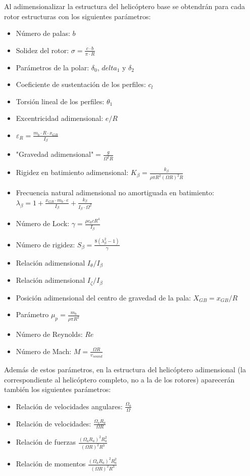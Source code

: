 Al adimensionalizar la estructura del helicóptero base se obtendrán para cada rotor estructuras con los siguientes parámetros:
\singlespacing
\begin{multicols}{2}
	\begin{itemize}
		\item Número de palas: $b$
		\item Solidez del rotor: $\sigma=\frac{c\cdot b}{\pi\cdot R}$
		\item Parámetros de la polar: $\delta_0$, $delta_1$ y $\delta_2$
		\item Coeficiente de sustentación de los perfiles: $c_l$
		\item Torsión lineal de los perfiles: $\theta_1$
		\item Excentricidad adimensional: $e/R$
		\item $\varepsilon_R=\frac{m_b\cdot R\cdot x_{GB}}{I_\beta}$
		\item "Gravedad adimensional"$=\frac{g}{\Omega^2R}$
		\item Rigidez en batimiento adimensional: $K_\beta=\frac{k_\beta}{\rho \pi R^2(\Omega R)^2R}$
		\item Frecuencia natural adimensional no amortiguada en batimiento: $\lambda_\beta=1+\frac{x_{GB}\cdot m_b\cdot e}{I_\beta}+\frac{k_\beta}{I_\beta\cdot\Omega^2}$
		\item Número de Lock: $\gamma=\frac{\rho c_0cR^4}{I_\beta}$
		\item Número de rigidez: $S_\beta=\frac{8(\lambda_\beta^2-1)}{\gamma}$
		\item Relación adimensional $I_\theta/I_\beta$
		\item Relación adimensional $I_\zeta/I_\beta$
		\item Posición adimensional del centro de gravedad de la pala: $X_{GB}=x_{GB}/R$
		\item Parámetro $\mu_p=\frac{m_b}{\rho\pi R^3}$
		\item Número de Reynolds: $Re$
		\item Número de Mach: $M=\frac{\Omega R}{v_{sound}}$
		\end{itemize}
\end{multicols}
Además de estos parámetros, en la estructura del helicóptero adimensional (la correspondiente al helicóptero completo, no a la de los rotores) aparecerán también los siguientes parámetros:
\singlespacing
\begin{multicols}{2}
	\begin{itemize}
		\item Relación de velocidades angulares: $\frac{\Omega_a}{\Omega}$
		\item Relación de velocidades: $\frac{\Omega_aR_a}{\Omega R}$
		\item Relación de fuerzas $\frac{(\Omega_aR_a)^2R_a^2}{(\Omega R)^2R^3}$
		\item Relación de momentos $\frac{(\Omega_aR_a)^2R_a^2}{(\Omega R)^2R^3}$
	\end{itemize}
\end{multicols}
